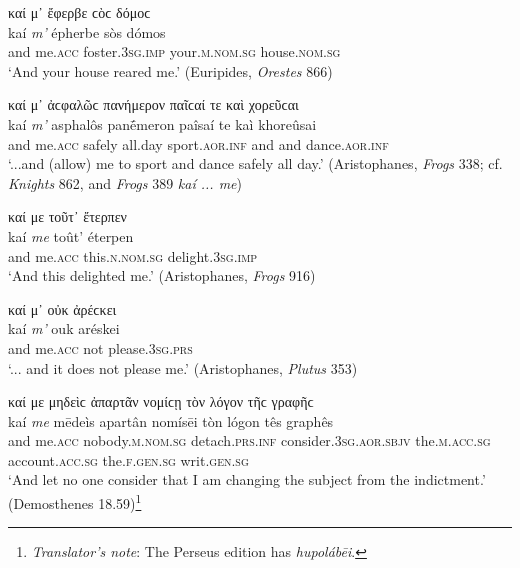 \begin{exe}
\ex καί μ᾽ ἔφερβε ϲὸϲ δόμοϲ\\
\gll kaí \emph{m'} épherbe sòs dómos\\
and me.\textsc{acc} foster.\textsc{3sg.imp} your.\textsc{m.nom.sg}
house.\textsc{nom.sg}\\
\trans `And your house reared me.' (Euripides, \textit{Orestes} 866)
\label{kaime16}
\end{exe}

\begin{exe}
\ex καί μ᾽ ἀϲφαλῶϲ πανήμερον παῖϲαί τε καὶ χορεῦϲαι\\
\gll kaí \emph{m'} asphalôs panḗmeron paîsaí te kaì khoreûsai\\
and me.\textsc{acc} safely all.day sport.\textsc{aor.inf} and and dance.\textsc{aor.inf}\\
\trans `...and (allow) me to sport and dance safely all day.' (Aristophanes, \textit{Frogs} 338; cf. \textit{Knights} 862, and \textit{Frogs} 389 \textit{kaí ... me})
\label{kaime17}
\end{exe}

\begin{exe}
\ex καί με τοῦτ᾽ ἔτερπεν\\
\gll kaí \emph{me} toût' éterpen\\
and me.\textsc{acc} this.\textsc{n.nom.sg} delight.\textsc{3sg.imp}\\
\trans `And this delighted me.' (Aristophanes, \textit{Frogs} 916)
\label{kaime18}
\end{exe}

\begin{exe}
\ex καί μ᾽ οὐκ ἀρέϲκει\\
\gll kaí \emph{m'} ouk aréskei\\
and me.\textsc{acc} not please.\textsc{3sg.prs}\\
\trans `... and it does not please me.' (Aristophanes, \textit{Plutus} 353)
\label{kaime19}
\end{exe}

\begin{exe}
\ex καί με μηδεὶϲ ἀπαρτᾶν νομίϲῃ τὸν λόγον τῆϲ γραφῆϲ\\
\gll kaí \emph{me} mēdeìs apartân nomísēi tòn lógon tês graphês\\
and me.\textsc{acc} nobody.\textsc{m.nom.sg} detach.\textsc{prs.inf}
consider.\textsc{3sg.aor.sbjv} the.\textsc{m.acc.sg} account.\textsc{acc.sg} the.\textsc{f.gen.sg} writ.\textsc{gen.sg}\\
\trans `And let no one consider that I am changing the subject from the indictment.' (Demosthenes 18.59)\footnote{\emph{Translator's note}: The Perseus edition has \textit{hupolábēi}.}
\label{kaime20}
\end{exe}

